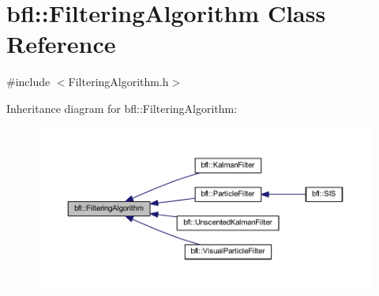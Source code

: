 \hypertarget{classbfl_1_1FilteringAlgorithm}{}\section{bfl\+:\+:Filtering\+Algorithm Class Reference}
\label{classbfl_1_1FilteringAlgorithm}


{\ttfamily \#include $<$Filtering\+Algorithm.\+h$>$}



Inheritance diagram for bfl\+:\+:Filtering\+Algorithm\+:
\nopagebreak
\begin{figure}[H]
\begin{center}
\leavevmode
\includegraphics[width=350pt]{classbfl_1_1FilteringAlgorithm__inherit__graph}
\end{center}
\end{figure}
